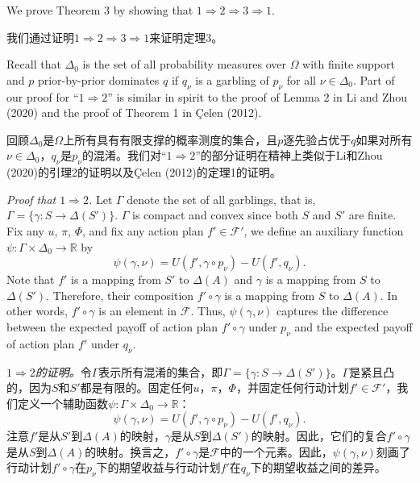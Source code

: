 \documentclass[12pt,a4paper]{article}
\newenvironment{original}
  {\par\vspace{4pt}\noindent\color{black}\ignorespaces}
  {\par\vspace{2pt}}
\newenvironment{translation}
  {\par\vspace{2pt}\noindent\color{myblue}\ignorespaces}
  {\par\vspace{6pt}}
\newcommand{\R}{\mathbb{R}}
\newcommand{\Delt}{\Delta}
\newcommand{\calF}{\mathcal{F}}
\begin{document}
\begin{original}
We prove Theorem 3 by showing that $1\Rightarrow 2\Rightarrow 3\Rightarrow 1$.
\end{original}

\begin{translation}
我们通过证明$1\Rightarrow 2\Rightarrow 3\Rightarrow 1$来证明定理3。
\end{translation}

\begin{original}
Recall that $\Delt_0$ is the set of all probability measures over $\Omega$ with finite support and $p$ prior-by-prior dominates $q$ if $q_{\nu}$ is a garbling of $p_{\nu}$ for all $\nu\in\Delt_0$. Part of our proof for ``$1\Rightarrow 2$'' is similar in spirit to the proof of Lemma 2 in Li and Zhou (2020) and the proof of Theorem 1 in \c{C}elen (2012).
\end{original}

\begin{translation}
回顾$\Delt_0$是$\Omega$上所有具有有限支撑的概率测度的集合，且$p$逐先验占优于$q$如果对所有$\nu\in\Delt_0$，$q_{\nu}$是$p_{\nu}$的混淆。我们对``$1\Rightarrow 2$''的部分证明在精神上类似于Li和Zhou (2020)的引理2的证明以及\c{C}elen (2012)的定理1的证明。
\end{translation}

\begin{original}
\textit{Proof that $1\Rightarrow 2$.} Let $\Gamma$ denote the set of all garblings, that is, $\Gamma=\{\gamma:S\to\Delt(S')\}$. $\Gamma$ is compact and convex since both $S$ and $S'$ are finite. Fix any $u$, $\pi$, $\Phi$, and fix any action plan $f'\in\calF'$, we define an auxiliary function $\psi:\Gamma\times\Delt_0\to\R$ by
\begin{equation}
    \psi(\gamma,\nu) = U(f',\gamma\circ p_{\nu}) - U(f',q_{\nu}).
\end{equation}
Note that $f'$ is a mapping from $S'$ to $\Delt(A)$ and $\gamma$ is a mapping from $S$ to $\Delt(S')$. Therefore, their composition $f'\circ\gamma$ is a mapping from $S$ to $\Delt(A)$. In other words, $f'\circ\gamma$ is an element in $\calF$. Thus, $\psi(\gamma,\nu)$ captures the difference between the expected payoff of action plan $f'\circ\gamma$ under $p_{\nu}$ and the expected payoff of action plan $f'$ under $q_{\nu}$.
\end{original}

\begin{translation}
\textit{$1\Rightarrow 2$的证明。}令$\Gamma$表示所有混淆的集合，即$\Gamma=\{\gamma:S\to\Delt(S')\}$。$\Gamma$是紧且凸的，因为$S$和$S'$都是有限的。固定任何$u$，$\pi$，$\Phi$，并固定任何行动计划$f'\in\calF'$，我们定义一个辅助函数$\psi:\Gamma\times\Delt_0\to\R$：
\begin{equation}
    \psi(\gamma,\nu) = U(f',\gamma\circ p_{\nu}) - U(f',q_{\nu}).
\end{equation}
注意$f'$是从$S'$到$\Delt(A)$的映射，$\gamma$是从$S$到$\Delt(S')$的映射。因此，它们的复合$f'\circ\gamma$是从$S$到$\Delt(A)$的映射。换言之，$f'\circ\gamma$是$\calF$中的一个元素。因此，$\psi(\gamma,\nu)$刻画了行动计划$f'\circ\gamma$在$p_{\nu}$下的期望收益与行动计划$f'$在$q_{\nu}$下的期望收益之间的差异。
\end{translation}
\end{document}
